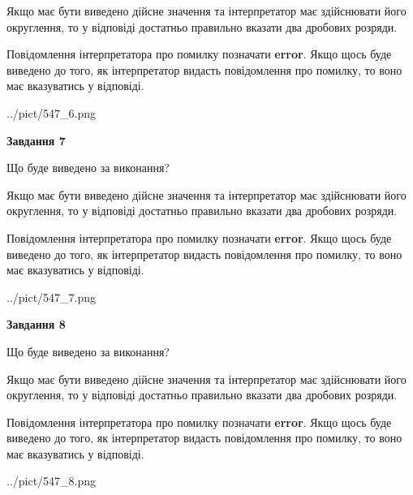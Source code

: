 \documentclass[12pt, ukrainian]{article}
\begin{document}
{\begin {Large}
Якщо має бути виведено дійсне значення та інтерпретатор має здійснювати його округлення, 
то у відповіді достатньо правильно вказати два дробових розряди.

Повідомлення інтерпретатора про помилку позначати \textbf{error}.
Якщо щось буде виведено до того, як інтерпретатор видасть повідомлення про помилку, 
то воно має вказуватись у відповіді. \par

\begin{center}
	{../pict/547_6.png}
\end{center}
\newpage

{\begin {center}\textbf{Завдання 7}\end {center}}\par
Що буде виведено за виконання? \par

Якщо має бути виведено дійсне значення та інтерпретатор має здійснювати його округлення, 
то у відповіді достатньо правильно вказати два дробових розряди.

Повідомлення інтерпретатора про помилку позначати \textbf{error}.
Якщо щось буде виведено до того, як інтерпретатор видасть повідомлення про помилку, 
то воно має вказуватись у відповіді. \par

\begin{center}
	{../pict/547_7.png}
\end{center}
\newpage

{\begin {center}\textbf{Завдання 8}\end {center}}\par
Що буде виведено за виконання? \par

Якщо має бути виведено дійсне значення та інтерпретатор має здійснювати його округлення, 
то у відповіді достатньо правильно вказати два дробових розряди.

Повідомлення інтерпретатора про помилку позначати \textbf{error}.
Якщо щось буде виведено до того, як інтерпретатор видасть повідомлення про помилку, 
то воно має вказуватись у відповіді. \par

\begin{center}
	{../pict/547_8.png}
\end{center}
\newpage


\end{Large}}
\end{document}
